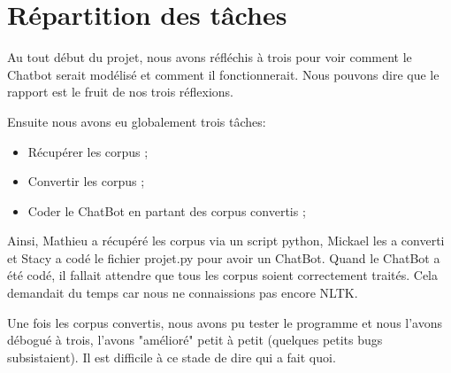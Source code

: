 \section{Répartition des tâches}
	Au tout début du projet, nous avons réfléchis à trois pour voir comment le Chatbot serait modélisé et comment il fonctionnerait. Nous pouvons dire que le rapport est le fruit de nos trois réflexions.

	Ensuite nous avons eu globalement trois tâches:
	\begin{itemize}
		\item Récupérer les corpus ;
		\item Convertir les corpus ;
		\item Coder le ChatBot en partant des corpus convertis ;
	\end{itemize}

	Ainsi, Mathieu a récupéré les corpus via un script python, Mickael les a converti et Stacy a codé le fichier projet.py pour avoir un ChatBot.
	Quand le ChatBot a été codé, il fallait attendre que tous les corpus soient correctement traités. Cela demandait du temps car nous ne connaissions pas encore NLTK.

	Une fois les corpus convertis, nous avons pu tester le programme et nous l'avons débogué à trois, l'avons "amélioré" petit à petit (quelques petits bugs subsistaient). Il est difficile à ce stade de dire qui a fait quoi.
